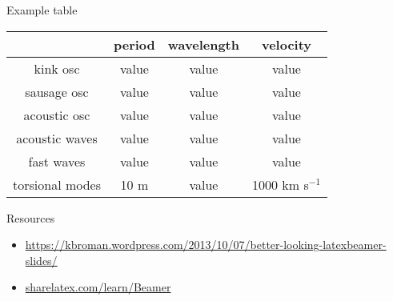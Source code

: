 \documentclass[9pt]{beamer}
\begin{document}
\begin{frame}{Example table}
    \begin{center}
        \begin{tabular}{c|c|c|c|}
            \cline{2-4} & {\textbf{period}} & {\textbf{wavelength}} &
                {\textbf{velocity}}\\
            \hline \multicolumn{0}{|c|}{kink osc} & value & value & value\\
            \hline \multicolumn{0}{|c|}{sausage osc} & value & value & value\\
            \hline \multicolumn{0}{|c|}{acoustic osc} & value & value & value\\
            \hline \multicolumn{0}{|c|}{acoustic waves} & value & value & value\\
            \hline \multicolumn{0}{|c|}{fast waves} & value & value & value\\
            \hline \multicolumn{0}{|c|}{torsional modes} & 10 m & value &
                1000 km s$^{-1}$\\
            \hline
        \end{tabular}
    \end{center}
\end{frame}%

%
%

\begin{frame}[fragile=singleslide]{Resources}
    \begin{itemize}
        \item \url{https://kbroman.wordpress.com/2013/10/07/better-looking-latexbeamer-slides/}
        \item \url{sharelatex.com/learn/Beamer}
    \end{itemize}
\end{frame}
\end{document}
